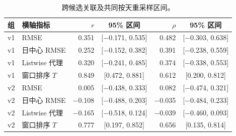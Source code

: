 \begin{table}[!htbp]
\centering\small
\caption{跨候选关联及共同按天重采样区间。}\label{tab:corr}
\begin{tabularx}{\linewidth}{@{}lXrcrc@{}}
\toprule
组 & 横轴指标 & $r$ & 95\% 区间 & $\rho$ & 95\% 区间 \\
\midrule
v1 & RMSE & 0.351 & [$-$0.171, 0.535] & 0.482 & [$-$0.303, 0.638] \\
v1 & 日中心 RMSE & 0.252 & [$-$0.152, 0.382] & 0.391 & [$-$0.238, 0.559] \\
v1 & Listwise 代理 & 0.320 & [$-$0.241, 0.485] & 0.374 & [$-$0.338, 0.553] \\
v1 & 窗口排序 $T$ & 0.849 & [0.472, 0.881] & 0.612 & [0.200, 0.812] \\
v2 & RMSE & 0.005 & [$-$0.438, 0.333] & 0.082 & [$-$0.474, 0.321] \\
v2 & 日中心 RMSE & $-$0.108 & [$-$0.488, 0.203] & $-$0.035 & [$-$0.484, 0.233] \\
v2 & Listwise 代理 & $-$0.165 & [$-$0.518, 0.124] & $-$0.039 & [$-$0.460, 0.093] \\
v2 & 窗口排序 $T$ & 0.777 & [0.197, 0.852] & 0.656 & [0.135, 0.814] \\
\bottomrule
\end{tabularx}
\par\vspace{3pt}{\footnotesize $r$ 为 Pearson；$\rho$ 为跨候选 Spearman。窗口 $T$ 本身另含窗口内 Spearman。7 日块、10,000 次 percentile 重采样，仅改变日期、固定候选集合；区间不包含候选搜索或抽样不确定性。}
\end{table}
